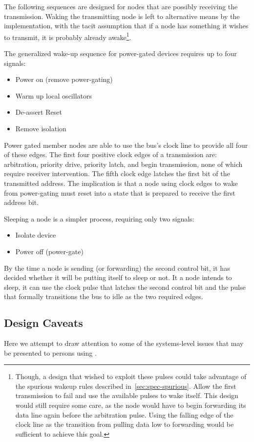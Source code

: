 The following sequences are designed for nodes that are possibly receiving the
transmission. Waking the transmitting node is left to alternative means by the
implementation, with the tacit assumption that if a node has something it
wishes to transmit, it is probably already awake\footnote{
  Though, a design that wished to exploit these pulses could take advantage of
  the spurious wakeup rules described in~\ref{sec:spec-spurious}. Allow the
  first transmission to fail and use the available pulses to wake itself. This
  design would still require some care, as the node would have to begin
  forwarding its data line again before the arbitration pulse. Using the
  falling edge of the clock line as the transition from pulling data low to
  forwarding would be sufficient to achieve this goal.
}.

The generalized wake-up sequence for power-gated devices requires up to four
signals:
%
\begin{itemize}
  \item Power on (remove power-gating)
  \item Warm up local oscillators
  \item De-assert Reset
  \item Remove isolation
\end{itemize}
%
Power gated \bus member nodes are able to use the bus's clock line to provide
all four of these edges. The first four positive clock edges of a \bus
transmission are: arbitration, priority drive, priority latch, and begin
transmission, none of which require receiver intervention. The fifth clock
edge latches the first bit of the transmitted address. The implication is that
a node using \bus clock edges to wake from power-gating must reset into a
state that is prepared to receive the first address bit.

Sleeping a node is a simpler process, requiring only two signals:
%
\begin{itemize}
  \item Isolate device
  \item Power off (power-gate)
\end{itemize}
%
By the time a node is sending (or forwarding) the second control bit, it has
decided whether it will be putting itself to sleep or not. It a node intends
to sleep, it can use the clock pulse that latches the second control bit and
the pulse that formally transitions the bus to idle as the two required edges.

\subsection{Design Caveats}
Here we attempt to draw attention to some of the systems-level issues that may
be presented to persons using \bus.

